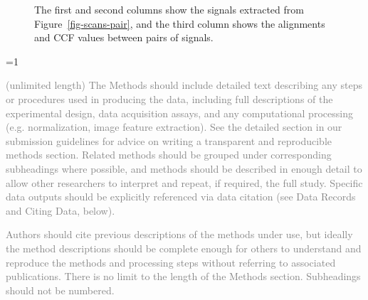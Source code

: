 \documentclass[fleqn,10pt]{wlscirep}
\newcommand{\ifinstruction}{0} %
\begin{document}
\begin{figure}


\caption{\label{fig-signals-pair-alignment}The first and second columns
show the signals extracted from Figure~\ref{fig-scans-pair}, and the
third column shows the alignments and CCF values between pairs of
signals.}

\end{figure}%

\ifnum \ifinstruction=1

\textcolor{gray}{(unlimited length) The Methods should include detailed text describing any steps or procedures used in producing the data, including full descriptions of the experimental design, data acquisition assays, and any computational processing (e.g. normalization, image feature extraction). See the detailed section in our submission guidelines for advice on writing a transparent and reproducible methods section. Related methods should be grouped under corresponding subheadings where possible, and methods should be described in enough detail to allow other researchers to interpret and repeat, if required, the full study. Specific data outputs should be explicitly referenced via data citation (see Data Records and Citing Data, below).}

\textcolor{gray}{Authors should cite previous descriptions of the methods under use, but ideally the method descriptions should be complete enough for others to understand and reproduce the methods and processing steps without referring to associated publications. There is no limit to the length of the Methods section. Subheadings should not be numbered.}
\end{document}
